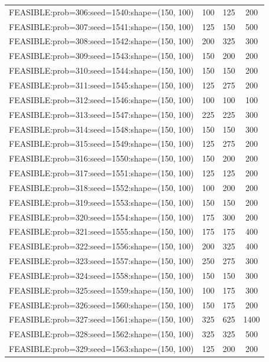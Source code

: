 \begin{longtable}{lccc}
FEASIBLE:prob=306:seed=1540:shape=(150, 100) &  100 &   125 &    200 \\
FEASIBLE:prob=307:seed=1541:shape=(150, 100) &  125 &   150 &    500 \\
FEASIBLE:prob=308:seed=1542:shape=(150, 100) &  200 &   325 &    300 \\
FEASIBLE:prob=309:seed=1543:shape=(150, 100) &  150 &   200 &    200 \\
FEASIBLE:prob=310:seed=1544:shape=(150, 100) &  150 &   150 &    200 \\
FEASIBLE:prob=311:seed=1545:shape=(150, 100) &  125 &   275 &    200 \\
FEASIBLE:prob=312:seed=1546:shape=(150, 100) &  100 &   100 &    100 \\
FEASIBLE:prob=313:seed=1547:shape=(150, 100) &  225 &   225 &    300 \\
FEASIBLE:prob=314:seed=1548:shape=(150, 100) &  150 &   150 &    300 \\
FEASIBLE:prob=315:seed=1549:shape=(150, 100) &  125 &   275 &    200 \\
FEASIBLE:prob=316:seed=1550:shape=(150, 100) &  150 &   200 &    200 \\
FEASIBLE:prob=317:seed=1551:shape=(150, 100) &  125 &   125 &    200 \\
FEASIBLE:prob=318:seed=1552:shape=(150, 100) &  100 &   200 &    200 \\
FEASIBLE:prob=319:seed=1553:shape=(150, 100) &  150 &   150 &    200 \\
FEASIBLE:prob=320:seed=1554:shape=(150, 100) &  175 &   300 &    200 \\
FEASIBLE:prob=321:seed=1555:shape=(150, 100) &  175 &   175 &    400 \\
FEASIBLE:prob=322:seed=1556:shape=(150, 100) &  200 &   325 &    400 \\
FEASIBLE:prob=323:seed=1557:shape=(150, 100) &  250 &   275 &    300 \\
FEASIBLE:prob=324:seed=1558:shape=(150, 100) &  150 &   150 &    300 \\
FEASIBLE:prob=325:seed=1559:shape=(150, 100) &  100 &   175 &    300 \\
FEASIBLE:prob=326:seed=1560:shape=(150, 100) &  150 &   175 &    200 \\
FEASIBLE:prob=327:seed=1561:shape=(150, 100) &  325 &   625 &   1400 \\
FEASIBLE:prob=328:seed=1562:shape=(150, 100) &  325 &   325 &    500 \\
FEASIBLE:prob=329:seed=1563:shape=(150, 100) &  125 &   200 &    200 \\

\end{longtable}
